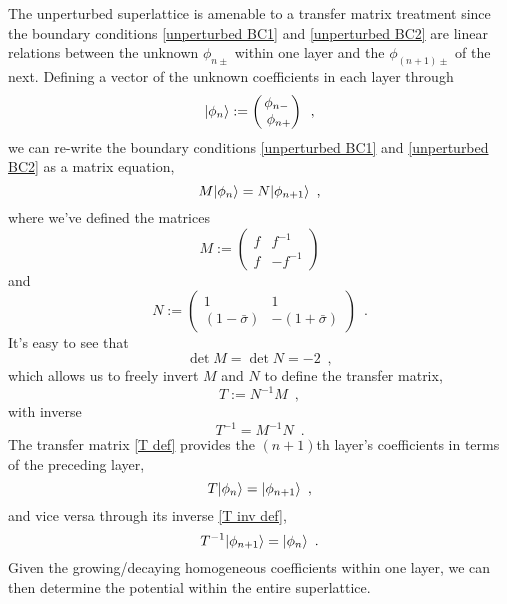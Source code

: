 \documentclass{article}
\newcommand{\bpm}{\begin{pmatrix}}
\newcommand{\epm}{\end{pmatrix}}
\DeclarePairedDelimiter\ket{\lvert}{\rangle}
\begin{document}
The unperturbed superlattice is amenable to a transfer matrix treatment since the boundary conditions \eqref{unperturbed BC1} and \eqref{unperturbed BC2} are linear relations between the unknown $\phi_{n\pm}$ within one layer and the $\phi_{(n+1)\pm}$ of the next.  Defining a vector of the unknown coefficients in each layer through
\begin{equation}
    \label{phi vec def}
    \ket{\phi_n}:=\bpm
    \phi_{n-}
    \\\
    \phi_{n+}
    \epm
    \,\,\,,
\end{equation}
we can re-write the boundary conditions \eqref{unperturbed BC1} and \eqref{unperturbed BC2} as a matrix equation,
\begin{equation}
    \label{matrix BC}
    M\ket{\phi_n}= N\ket{\phi_{n+1}}
    \,\,\,,
\end{equation}
where we've defined the matrices
\begin{equation}
    \label{M def}
    M:=\bpm
    f & f^{-1}
    \\
    f & -f^{-1}
    \epm
\end{equation}
and
\begin{equation}
    \label{N def}
    N:=
    \bpm
    1 & 1
    \\
    (1-\bar\sigma) & -(1+\bar \sigma)
    \epm
    \,\,\,.
\end{equation}
It's easy to see that 
\begin{equation}
    \label{M and N det}
    \det M = \det N = -2
    \,\,\,,
\end{equation}
which allows us to freely invert $M$ and $N$ to define the transfer matrix,
\begin{equation}
    \label{T def}
    T:= N^{-1} M
    \,\,\,,
\end{equation}
with inverse
\begin{equation}
    \label{T inv def}
    T^{-1} = M^{-1} N
    \,\,\,.
\end{equation}
The transfer matrix \eqref{T def} provides the $(n+1)$th layer's coefficients in terms of the preceding layer,
\begin{equation}
    \label{T action}
    T\ket{\phi_n} = \ket{\phi_{n+1}}
    \,\,\,,
\end{equation}
and vice versa through its inverse \eqref{T inv def},
\begin{equation}
    \label{T inv action}
    T^{-1}\ket{\phi_{n+1}} = \ket{\phi_n}
    \,\,\,.
\end{equation}
Given the growing/decaying homogeneous coefficients within one layer, we can then determine the potential within the entire superlattice.
\end{document}
